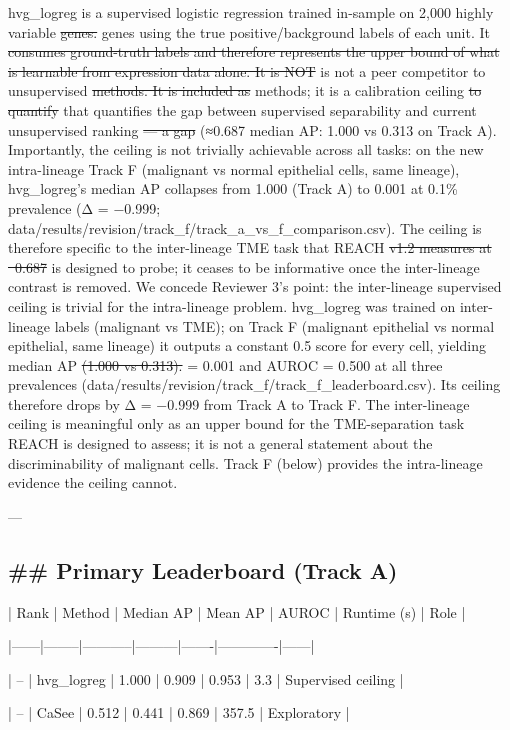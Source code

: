 \documentclass[11pt]{article}
\newcommand{\added}[1]{{\color{trackred}#1}}
\newcommand{\deleted}[1]{{\color{trackred}\sout{#1}}}
\begin{document}
hvg_logreg is a supervised logistic regression trained in-sample on 2,000 highly variable \deleted{genes.} \added{genes using the true positive/background labels of each unit.} It \deleted{consumes ground-truth labels and therefore represents the upper bound of what is learnable from expression data alone. It is NOT} \added{is not} a peer competitor to unsupervised \deleted{methods. It is included as} \added{methods; it is} a calibration ceiling \deleted{to quantify} \added{that quantifies} the gap between supervised separability and current unsupervised ranking \deleted{— a gap} \added{(≈0.687 median AP: 1.000 vs 0.313 on Track A). Importantly, the ceiling is not trivially achievable across all tasks: on the new intra-lineage Track F (malignant vs normal epithelial cells, same lineage), hvg\_logreg's median AP collapses from 1.000 (Track A) to 0.001 at 0.1\% prevalence (Δ = −0.999; data/results/revision/track\_f/track\_a\_vs\_f\_comparison.csv). The ceiling is therefore specific to the inter-lineage TME task} that REACH \deleted{v1.2 measures at ~0.687} \added{is designed to probe; it ceases to be informative once the inter-lineage contrast is removed. We concede Reviewer 3's point: the inter-lineage supervised ceiling is trivial for the intra-lineage problem. hvg\_logreg was trained on inter-lineage labels (malignant vs TME); on Track F (malignant epithelial vs normal epithelial, same lineage) it outputs a constant 0.5 score for every cell, yielding} median AP \deleted{(1.000 vs 0.313).} \added{= 0.001 and AUROC = 0.500 at all three prevalences (data/results/revision/track\_f/track\_f\_leaderboard.csv). Its ceiling therefore drops by Δ = −0.999 from Track A to Track F. The inter-lineage ceiling is meaningful only as an upper bound for the TME-separation task REACH is designed to assess; it is not a general statement about the discriminability of malignant cells. Track F (below) provides the intra-lineage evidence the ceiling cannot.}

---

\subsection*{\#\# Primary Leaderboard (Track A)}
| Rank | Method | Median AP | Mean AP | AUROC | Runtime (s) | Role |

|------|--------|-----------|---------|-------|-------------|------|

| -- | hvg\_logreg | 1.000 | 0.909 | 0.953 | 3.3 | Supervised ceiling |

| -- | CaSee | 0.512 | 0.441 | 0.869 | 357.5 | Exploratory |
\end{document}
